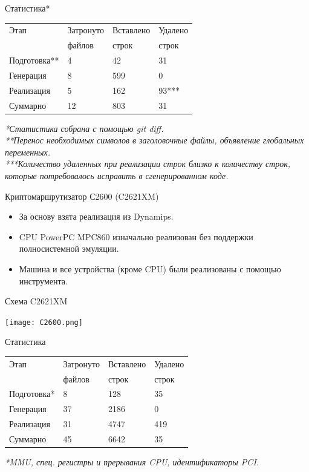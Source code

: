 \documentclass[unicode,hyperref={unicode=true}]{beamer}
\theoremstyle{definition}
\theoremstyle{plain}
\begin{document}
\begin{frame}{Статистика*}
\begin{center}
\begin{tabular}{l|lll}
Этап         & Затронуто & Вставлено & Удалено \\
             & файлов    & строк     & строк   \\
\hline
Подготовка** & 4         & 42        & 31      \\
Генерация    & 8         & 599       & 0       \\
Реализация   & 5         & 162       & 93***   \\
Суммарно     & 12        & 803       & 31      \\
\end{tabular}
\end{center}
\vfill
\it{*Статистика собрана с помощью git diff.}\\
\it{**Перенос необходимых символов в заголовочные файлы,
объявление глобальных переменных.}\\
\it{***Количество удаленных при реализации строк близко к количеству строк,
которые потребовалось исправить в сгенерированном коде.}
\end{frame}



\begin{frame}{Криптомаршрутизатор С2600 (C2621XM)}
\begin{itemize}
\item За основу взята реализация из Dynamips.
\item CPU PowerPC MPC860 изначально реализован без поддержки полносистемной
эмуляции.
\item Машина и все устройства (кроме CPU) были реализованы с помощью
инструмента.
\end{itemize}
\end{frame}



\begin{frame}{Схема C2621XM}
\begin{center}
\texttt{[image: C2600.png]}
\end{center}
\end{frame}



\begin{frame}{Статистика}
\begin{center}
\begin{tabular}{l|lll}
Этап         & Затронуто & Вставлено & Удалено \\
             & файлов    & строк     & строк   \\
\hline
Подготовка*  & 8         & 128       & 35      \\
Генерация    & 37        & 2186      & 0       \\
Реализация   & 31        & 4747      & 419     \\
Суммарно     & 45        & 6642      & 35      \\
\end{tabular}
\end{center}
\vfill
\it{*MMU, спец. регистры и прерывания CPU, идентификаторы PCI.}
\end{frame}
\end{document}
